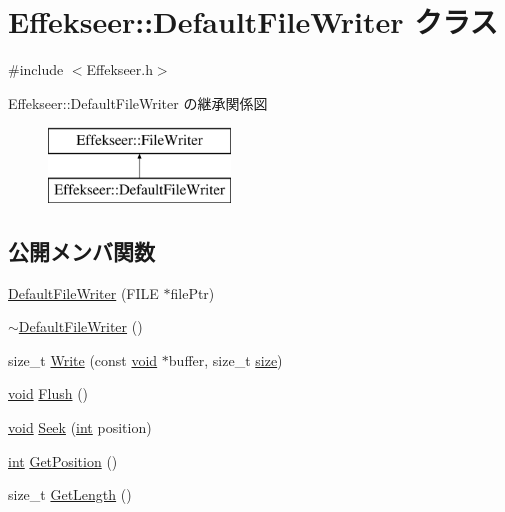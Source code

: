 \hypertarget{class_effekseer_1_1_default_file_writer}{}\section{Effekseer\+:\+:Default\+File\+Writer クラス}
\label{class_effekseer_1_1_default_file_writer}


{\ttfamily \#include $<$Effekseer.\+h$>$}

Effekseer\+:\+:Default\+File\+Writer の継承関係図\begin{figure}[H]
\begin{center}
\leavevmode
\includegraphics[height=2.000000cm]{class_effekseer_1_1_default_file_writer}
\end{center}
\end{figure}
\subsection*{公開メンバ関数}
\begin{DoxyCompactItemize}
\item 
\mbox{\hyperlink{class_effekseer_1_1_default_file_writer_a36fd2edb04fed0e00fd73c60767930ba}{Default\+File\+Writer}} (F\+I\+LE $\ast$file\+Ptr)
\item 
\mbox{\hyperlink{class_effekseer_1_1_default_file_writer_a23a94c58f15c27b02404b98a9dbd5a7e}{$\sim$\+Default\+File\+Writer}} ()
\item 
size\+\_\+t \mbox{\hyperlink{class_effekseer_1_1_default_file_writer_afceaff03cd45477058ffdc1370d06884}{Write}} (const \mbox{\hyperlink{namespace_effekseer_ab34c4088e512200cf4c2716f168deb56}{void}} $\ast$buffer, size\+\_\+t \mbox{\hyperlink{namespace_effekseer_a73c68f3d33539d30844b9d1e058077f7}{size}})
\item 
\mbox{\hyperlink{namespace_effekseer_ab34c4088e512200cf4c2716f168deb56}{void}} \mbox{\hyperlink{class_effekseer_1_1_default_file_writer_a3b652725044e257665b48de729e79094}{Flush}} ()
\item 
\mbox{\hyperlink{namespace_effekseer_ab34c4088e512200cf4c2716f168deb56}{void}} \mbox{\hyperlink{class_effekseer_1_1_default_file_writer_a2329533000c58267e8e2457f3480bf73}{Seek}} (\mbox{\hyperlink{namespace_effekseer_ace0abf7c2e6947e519ebe8b54cbcc30a}{int}} position)
\item 
\mbox{\hyperlink{namespace_effekseer_ace0abf7c2e6947e519ebe8b54cbcc30a}{int}} \mbox{\hyperlink{class_effekseer_1_1_default_file_writer_aa85409b51ae30ea259ce2d0f0bd30656}{Get\+Position}} ()
\item 
size\+\_\+t \mbox{\hyperlink{class_effekseer_1_1_default_file_writer_a6745621cb9db4dc7d33d89de8aae435e}{Get\+Length}} ()
\end{DoxyCompactItemize}



